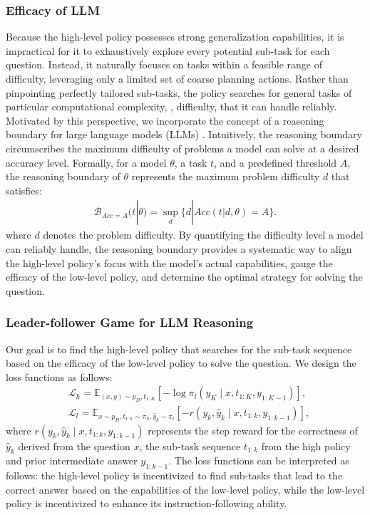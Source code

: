 \subsubsection{Efficacy of LLM}
Because the high-level policy possesses strong generalization capabilities, it is impractical for it to exhaustively explore every potential sub-task for each question. Instead, it naturally focuses on tasks within a feasible range of difficulty, leveraging only a limited set of coarse planning actions. Rather than pinpointing perfectly tailored sub-tasks, the policy searches for general tasks of particular computational complexity, \ie, difficulty, that it can handle reliably.
Motivated by this perspective, we incorporate the concept of a reasoning boundary for large language models (LLMs) \citep{chen2024unlocking}. Intuitively, the reasoning boundary circumscribes the maximum difficulty of problems a model can solve at a desired accuracy level. Formally, for a model $\theta$, a task $t$, and a predefined threshold $A$, the reasoning boundary of $\theta$ represents the maximum problem difficulty $d$ that satisfies:
\begin{align*}
    \mathcal{B}_{Acc=A}(t|\theta)=\sup_d\{d|Acc(t|d,\theta)=A\}.
\end{align*}
where $d$ denotes the problem difficulty. By quantifying the difficulty level a model can reliably handle, the reasoning boundary provides a systematic way to align the high-level policy’s focus with the model’s actual capabilities, gauge the efficacy of the low-level policy, and determine the optimal strategy for solving the question.

\subsubsection{Leader-follower Game for LLM Reasoning}

Our goal is to find the high-level policy that searches for the sub-task sequence based on the efficacy of the low-level policy to solve the question. We design the loss functions as follows:
\begin{align*}
    & \mathcal{L}_h = \mathbb{E}_{(x, y)\sim p_D, t_{1:K}}\left[ -\log \pi_l(y_K \mid x, t_{1:K}, y_{1:K-1}) \right], \\
    & \mathcal{L}_l = \mathbb{E}_{x\sim p_D, t_{1:k}\sim \pi_h, \hat{y}_k \sim \pi_l} \left[ -r(y_k, \hat{y}_k \mid x, t_{1:k}, y_{1:k-1}) \right],
\end{align*}
where $r(y_k, \hat{y}_k \mid x, t_{1:k}, y_{1:k-1})$ represents the step reward for the correctness of $\hat{y}_k$ derived from the question $x$, the sub-task sequence $t_{1:k}$ from the high policy and prior intermediate answer $y_{1:k-1}$.
The loss functions can be interpreted as follows: the high-level policy is incentivized to find sub-tasks that lead to the correct answer based on the capabilities of the low-level policy, while the low-level policy is incentivized to enhance its instruction-following ability.


